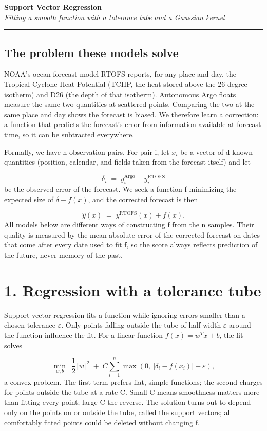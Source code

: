 \documentclass[11pt]{article}
\begin{document}
{\huge\bfseries Support Vector Regression}\\[2.5mm]
{\large\itshape Fitting a smooth function with a tolerance tube and a Gaussian kernel}\\[2mm]
\hrule\vspace{5mm}

\subsection*{The problem these models solve}
NOAA's ocean forecast model RTOFS reports, for any place and day, the Tropical Cyclone Heat Potential (TCHP, the heat stored above the 26 degree isotherm) and D26 (the depth of that isotherm). Autonomous Argo floats measure the same two quantities at scattered points. Comparing the two at the same place and day shows the forecast is biased. We therefore learn a correction: a function that predicts the forecast's error from information available at forecast time, so it can be subtracted everywhere.

Formally, we have n observation pairs. For pair i, let $x_i$ be a vector of d known quantities (position, calendar, and fields taken from the forecast itself) and let

\[ \delta_i \;=\; y_i^{\mathrm{Argo}} - y_i^{\mathrm{RTOFS}} \]
be the observed error of the forecast. We seek a function f minimizing the expected size of $\delta-f(x)$, and the corrected forecast is then

\[ \hat{y}(x) \;=\; y^{\mathrm{RTOFS}}(x) + f(x). \]
All models below are different ways of constructing f from the n samples. Their quality is measured by the mean absolute error of the corrected forecast on dates that come after every date used to fit f, so the score always reflects prediction of the future, never memory of the past.

\section*{1. Regression with a tolerance tube}
Support vector regression fits a function while ignoring errors smaller than a chosen tolerance $\varepsilon$. Only points falling outside the tube of half-width $\varepsilon$ around the function influence the fit. For a linear function $f(x)=w^{T}x+b$, the fit solves

\[ \min_{w,b} \;\ \frac{1}{2}\Vert w\Vert^2 \;+\; C\sum_{i=1}^{n} \max(0,\ |\delta_i - f(x_i)| - \varepsilon), \]
a convex problem. The first term prefers flat, simple functions; the second charges for points outside the tube at a rate C. Small C means smoothness matters more than fitting every point; large C the reverse. The solution turns out to depend only on the points on or outside the tube, called the support vectors; all comfortably fitted points could be deleted without changing f.
\end{document}
